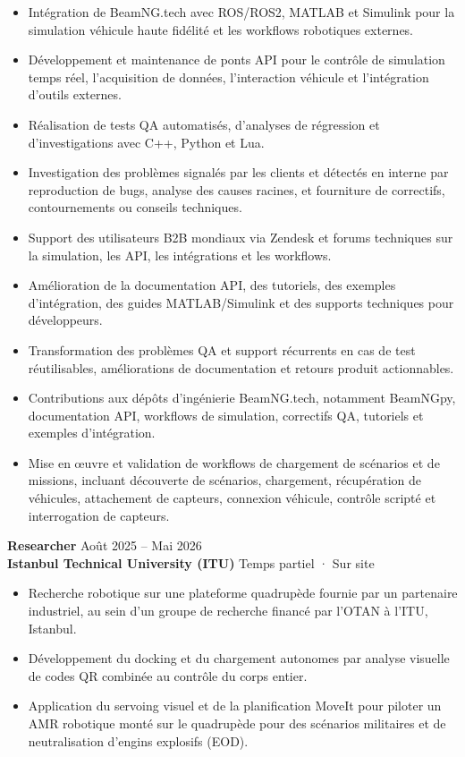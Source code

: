 \documentclass[11pt,a4paper]{article}
\begin{document}
\begin{itemize}
    \item Intégration de BeamNG.tech avec ROS/ROS2, MATLAB et Simulink pour la simulation véhicule haute fidélité et les workflows robotiques externes.
    \item Développement et maintenance de ponts API pour le contrôle de simulation temps réel, l'acquisition de données, l'interaction véhicule et l'intégration d'outils externes.
    \item Réalisation de tests QA automatisés, d'analyses de régression et d'investigations avec C++, Python et Lua.
    \item Investigation des problèmes signalés par les clients et détectés en interne par reproduction de bugs, analyse des causes racines, et fourniture de correctifs, contournements ou conseils techniques.
    \item Support des utilisateurs B2B mondiaux via Zendesk et forums techniques sur la simulation, les API, les intégrations et les workflows.
    \item Amélioration de la documentation API, des tutoriels, des exemples d'intégration, des guides MATLAB/Simulink et des supports techniques pour développeurs.
    \item Transformation des problèmes QA et support récurrents en cas de test réutilisables, améliorations de documentation et retours produit actionnables.
    \item Contributions aux dépôts d'ingénierie BeamNG.tech, notamment BeamNGpy, documentation API, workflows de simulation, correctifs QA, tutoriels et exemples d'intégration.
    \item Mise en œuvre et validation de workflows de chargement de scénarios et de missions, incluant découverte de scénarios, chargement, récupération de véhicules, attachement de capteurs, connexion véhicule, contrôle scripté et interrogation de capteurs.
\end{itemize}

\textbf{Researcher} \hfill Août 2025 -- Mai 2026\\
\textbf{Istanbul Technical University (ITU)} \hfill Temps partiel · Sur site

\begin{itemize}
    \item Recherche robotique sur une plateforme quadrupède fournie par un partenaire industriel, au sein d'un groupe de recherche financé par l'OTAN à l'ITU, Istanbul.
    \item Développement du docking et du chargement autonomes par analyse visuelle de codes QR combinée au contrôle du corps entier.
    \item Application du servoing visuel et de la planification MoveIt pour piloter un AMR robotique monté sur le quadrupède pour des scénarios militaires et de neutralisation d'engins explosifs (EOD).
\end{itemize}
\end{document}

